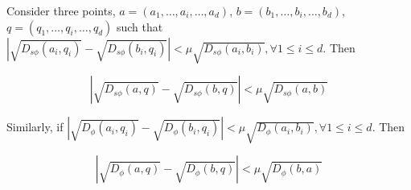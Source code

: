\documentclass[11pt]{myclass}
\newcommand{\breg}{\ensuremath{D_\phi}}
\newcommand{\sbreg}{\ensuremath{D_{s\phi}}}
\begin{document}
\begin{lemma}\label{AallDmusim}
Consider three points, $a = (a_1 , \ldots, a_i, \ldots, a_d)$, $b = (b_1 , \ldots, b_i, \ldots, b_d)$, $q = (q_1 , \ldots, q_i, \ldots, q_d)$ such that $ | \sqrt{\sbreg(a_i, q_i)} - \sqrt{\sbreg(b_i,q_i)}| < \mu \sqrt{\sbreg(a_i, b_i)}, \forall 1 \leq i \leq d$. Then 

\begin{equation}
\left| \sqrt{\sbreg(a, q)} - \sqrt{\sbreg(b,q)} \right| < \mu \sqrt{\sbreg(a, b)}
\end{equation}

Similarly, if $| \sqrt{\breg(a_i, q_i)} - \sqrt{\breg(b_i,q_i)}| < \mu \sqrt{\breg(a_i, b_i)}, \forall 1 \leq i \leq d$. Then 

\begin{equation}
\left| \sqrt{\breg(a, q)} - \sqrt{\breg(b,q)} \right| < \mu \sqrt{\breg(b,a)}
\end{equation}

\end{lemma}
\end{document}
